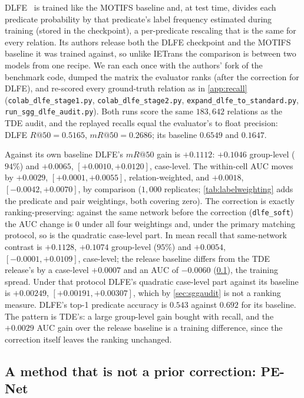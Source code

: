 DLFE~\cite{chiou2021recovering} is trained like the MOTIFS baseline and, at test time, divides
each predicate probability by that predicate's label frequency estimated during training
(stored in the checkpoint), a per-predicate rescaling that is the same for every relation. Its
authors release both the DLFE checkpoint and the MOTIFS baseline it was trained against, so
unlike IETrans the comparison is between two models from one recipe. We ran each once with the
authors' fork of the benchmark code, dumped the matrix the evaluator ranks (after the
correction for DLFE), and re-scored every ground-truth relation as in \cref{app:recall}
(\texttt{colab\_dlfe\_stage1.py}, \texttt{colab\_dlfe\_stage2.py},
\texttt{expand\_dlfe\_to\_standard.py}, \texttt{run\_sgg\_dlfe\_audit.py}). Both runs score the
same $183{,}642$ relations as the TDE audit, and the replayed recalls equal the evaluator's to
float precision: DLFE $R@50=0.5165$, $mR@50=0.2686$; its baseline $0.6549$ and $0.1647$.

Against its own baseline DLFE's $mR@50$ gain is $+0.1112$: $+0.1046$ group-level ($94\%$) and
$+0.0065$, $[+0.0010,+0.0120]$, case-level. The within-cell AUC moves by $+0.0029$,
$[+0.0001,+0.0055]$, relation-weighted, and $+0.0018$, $[-0.0042,+0.0070]$, by comparison
($1{,}000$ replicates; \cref{tab:labelweighting} adds the predicate and pair weightings, both
covering zero). The
correction is exactly ranking-preserving: against the same network before the correction
(\texttt{dlfe\_soft}) the AUC change is $0$ under all four weightings and, under the primary
matching protocol, so is the quadratic case-level part. In mean recall that same-network
contrast is $+0.1128$, $+0.1074$ group-level ($95\%$) and $+0.0054$, $[-0.0001,+0.0109]$,
case-level; the release baseline differs from the TDE release's by a case-level $+0.0007$ and
an AUC of $-0.0060$ (\cref{app:penet}), the training spread. Under that protocol DLFE's quadratic case-level part against its baseline is
$+0.00249$, $[+0.00191,+0.00307]$, which by \cref{sec:sggaudit} is not a ranking measure.
DLFE's top-1 predicate accuracy is $0.543$ against $0.692$ for its baseline. The pattern is
TDE's: a large group-level gain bought with recall, and the $+0.0029$ AUC gain over the release
baseline is a training difference, since the correction itself leaves the ranking unchanged.

\subsection{A method that is not a prior correction: PE-Net}\label{app:penet}

